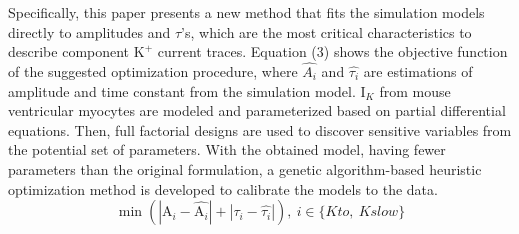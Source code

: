 \documentclass[journal]{IEEEtran}
\begin{document}
Specifically, this paper presents a new method that fits the simulation models directly to amplitudes and $\tau$'s, which are the most critical characteristics to describe component $\text{K}^{+}$ current traces. Equation (3) shows the objective function of the suggested optimization procedure, where $\hat{A_i}$ and $\hat{\tau_i}$ are estimations of amplitude and time constant from the simulation model. $\text{I}_{K}$ from mouse ventricular myocytes are modeled and parameterized based on partial differential equations. Then, full factorial designs are used to discover sensitive variables from the potential set of parameters. With the obtained model, having fewer parameters than the original formulation, a genetic algorithm-based heuristic optimization method is developed to calibrate the models to the data.
\begin{equation}
    \min (|\text{A}_i - \hat{\text{A}_i}| + |\tau_i - \hat{\tau_i}|), \ i \in \{Kto,\ Kslow\}
\end{equation}
\end{document}

